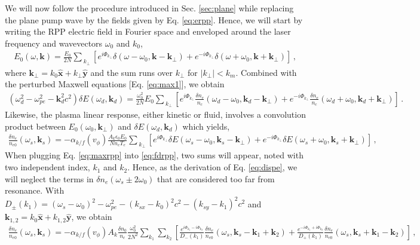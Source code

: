 \documentclass[
 reprint,
 amsmath,amssymb,
 aps,
]{revtex4-1}
\begin{document}
 \begin{widetext}
We will now follow the procedure introduced in Sec. \ref{sec:plane} while replacing the plane pump wave by the fields given by Eq. \eqref{eq:erpp}. Hence, we will start by writing the RPP electric field in Fourier space and enveloped around the laser frequency and wavevectors $\omega_0$ and $k_0$,
\begin{align}
E_0(\omega,\mathbf{k}) = \frac{E_0}{2N} \sum_{\ k_{\perp} }[ e^{i\Phi_{k_\perp}}\delta(\omega-\omega_0, \mathbf{k}-\mathbf{k}_\perp)    + e^{-i\Phi_{k_\perp}}\delta(\omega+\omega_0, \mathbf{k}+\mathbf{k}_\perp) ]
\, , \label{eq:erppf}
\end{align}
 where $\mathbf{k}_\perp= k_0\hat{\mathbf{x}} +k_\perp \hat{\mathbf{y}}$ and the sum runs over $k_\perp$ for $\vert k_\perp\vert  <k_m$.
 Combined with the perturbed Maxwell equations [Eq. \eqref{eq:max1}], we obtain
 \begin{align}
    (\omega_d^2 - \omega_{pe}^2 -\mathbf{k}_d^2c^2)\delta E(\omega_d,\mathbf{k}_d) = \frac{\omega_0^2}{2N} E_0 \sum_{\ k_{\perp} }   \left[e^{i\Phi_{k_\perp}}\frac{\delta n_e }{n_c}(\omega_d-\omega_0, \mathbf{k}_d-\mathbf{k}_\perp) +e^{-i\Phi_{k_\perp}}\frac{\delta n_e }{n_c}(\omega_d+\omega_0, \mathbf{k}_d+\mathbf{k}_\perp) \right] \, .\label{eq:maxrpp}
\end{align}
Likewise, the plasma linear response, either kinetic or fluid, involves a convolution product between $E_0(\omega_0,\mathbf{k}_\perp)$ and $\delta E(\omega_d,\mathbf{k}_d)$ which yields,
\begin{align}
   \frac{\delta n_e }{n_{e0}}(\omega_s,\mathbf{k}_s) = -\alpha_{k/f}(v_\phi) \frac{A_k\epsilon_0 E_0}{Nn_c T_e} \sum_{\ k_{\perp} }     \left[e^{i\Phi_{k_\perp}}\delta E(\omega_s-\omega_0, \mathbf{k}_s-\mathbf{k}_{\perp}) +e^{-i\Phi_{k_\perp}}\delta E(\omega_s+\omega_0, \mathbf{k}_s+\mathbf{k}_{\perp}) \right] \, ,\label{eq:fdrpp} 
\end{align}
When plugging Eq. \eqref{eq:maxrpp} into \eqref{eq:fdrpp}, two sums will appear, noted with two independent index, $k_1$ and $k_2$. Hence, as the derivation of Eq. \eqref{eq:dispe}, we will neglect the terms in $\delta n_e(\omega_s\pm 2\omega_0)$ that are considered too far from resonance. With $D_\pm(k_{1})= (\omega_s-\omega_0)^2 - \omega_{pe}^2 -( k_{sx}-k_0) ^2c^2 -( k_{sy}-k_{1}) ^2c^2$ and $\mathbf{k}_{1,2}= k_0\hat{\mathbf{x}} +k_{1,2} \hat{\mathbf{y}}$, we obtain
\begin{align}
   \frac{\delta n_e }{n_{e0}}(\omega_s,\mathbf{k}_s) = -\alpha_{k/f}(v_\phi)A_k \frac{\delta n_0}{n_c} \frac{\omega_0^2}{2N^2}\sum_{ k_{1} } \sum_{ k_{2} }        \left[ \frac{e^{i\Phi_{k_1}-i\Phi_{k_2}} }{D_-(k_{1})}\frac{\delta n_e }{n_{e0}}(\omega_s,\mathbf{k}_s-\mathbf{k}_{1}+\mathbf{k}_{2}) +\frac{e^{-i\Phi_{k_1}+i\Phi_{k_2}}}{D_+(k_{1})} \frac{\delta n_e }{n_{e0}}(\omega_s,\mathbf{k}_s+\mathbf{k}_{1}-\mathbf{k}_{2}) \right] \, ,\label{eq:fddrpp} 
\end{align}
 \end{widetext}
 
\end{document}
